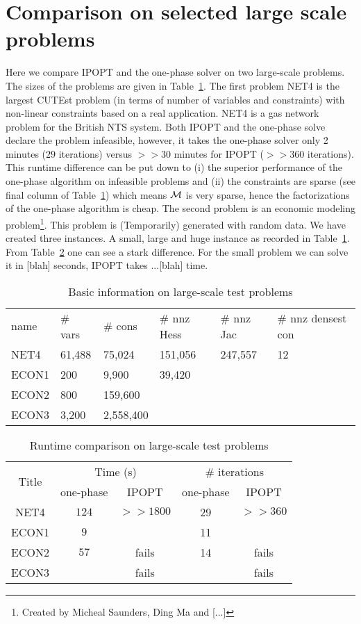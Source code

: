 \documentclass{article}
\begin{document}
\section{Comparison on selected large scale problems}

Here we compare IPOPT and the one-phase solver on two large-scale problems. The sizes of the problems are given in Table~\ref{large-scale:basic-info}. The first problem NET4 is the largest CUTEst problem (in terms of number of variables and constraints) with non-linear constraints based on a real application. NET4 is a gas network problem for the British NTS system. Both IPOPT and the one-phase solve declare the problem infeasible, however, it takes the one-phase solver only 2 minutes ($29$ iterations) versus $>>30$ minutes for IPOPT ($>>360$ iterations). This runtime difference can be put down to (i) the superior performance of the one-phase algorithm on infeasible problems and (ii) the constraints are sparse (see final column of Table~\ref{large-scale:basic-info}) which means $\mathcal{M}$ is very sparse, hence the factorizations of the one-phase algorithm is cheap. The second problem is an economic modeling problem\footnote{Created by Micheal Saunders, Ding Ma and [...]}. This problem is (Temporarily) generated with random data. We have created three instances. A small, large and huge instance as recorded in Table~\ref{large-scale:basic-info}. From Table~\ref{compare-runtime} one can see a stark difference. For the small problem we can solve it in [blah] seconds, IPOPT takes ...[blah] time. 

\begin{table}[H]
\begin{tabular}{l l l l l l}
name &  \# vars & \# cons & \# nnz Hess & \# nnz Jac & \# nnz densest con  \\ 
NET4 & 61,488 & 75,024  & 151,056 & 247,557 & 12 \\  
ECON1 &  200 & 9,900 & 39,420 & &  \\
ECON2 & 800 & 159,600 & & \\
ECON3 & 3,200 & 2,558,400 &  & 
\end{tabular}
\caption{Basic information on large-scale test problems}\label{large-scale:basic-info}
\end{table}

\begin{table}[H]
\begin{tabular}{|c| c c | c c |}
  \hline
  \multirow{2}{*}{Title} 
      & \multicolumn{2}{c|}{Time (s)} 
          & \multicolumn{2}{|c|}{\# iterations} \\             \cline{2-5}
  & one-phase & IPOPT & one-phase & IPOPT \\  \hline
  NET4 & $124$ & $>> 1800$  & 29   & $>> 360$ \\      \hline
  ECON1 & $9$  &  & 11 & \\      \hline
  ECON2 & $57$  &  fails & 14 & fails \\      \hline
  ECON3 &  & fails  & & fails \\      \hline
\end{tabular}
\caption{Runtime comparison on large-scale test problems}\label{compare-runtime}
\end{table}
\end{document}
